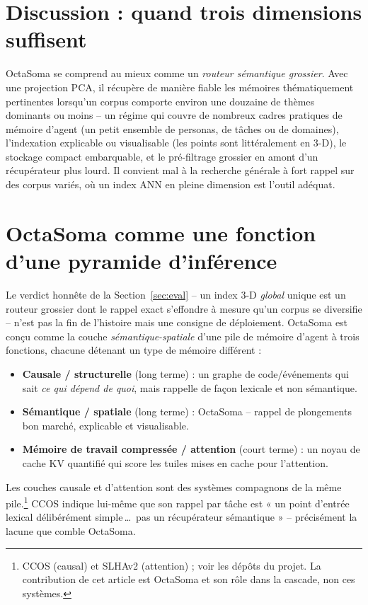 \documentclass[11pt]{article}
\begin{document}
\section{Discussion : quand trois dimensions suffisent}
OctaSoma se comprend au mieux comme un \emph{routeur sémantique grossier}. Avec une
projection PCA, il récupère de manière fiable les mémoires thématiquement pertinentes
lorsqu'un corpus comporte environ une douzaine de thèmes dominants ou moins -- un
régime qui couvre de nombreux cadres pratiques de mémoire d'agent (un petit ensemble
de personas, de tâches ou de domaines), l'indexation explicable ou visualisable (les
points sont littéralement en 3-D), le stockage compact embarquable, et le
pré-filtrage grossier en amont d'un récupérateur plus lourd. Il convient mal à la
recherche générale à fort rappel sur des corpus variés, où un index ANN en pleine
dimension est l'outil adéquat.

\section{OctaSoma comme une fonction d'une pyramide d'inférence}
\label{sec:pyramid}
Le verdict honnête de la Section~\ref{sec:eval} -- un index 3-D \emph{global} unique
est un routeur grossier dont le rappel exact s'effondre à mesure qu'un corpus se
diversifie -- n'est pas la fin de l'histoire mais une consigne de déploiement.
OctaSoma est conçu comme la couche \emph{sémantique-spatiale} d'une pile de mémoire
d'agent à trois fonctions, chacune détenant un type de mémoire différent :
\begin{itemize}
  \item \textbf{Causale / structurelle} (long terme) : un graphe de code/événements
  qui sait \emph{ce qui dépend de quoi}, mais rappelle de façon lexicale et non
  sémantique.
  \item \textbf{Sémantique / spatiale} (long terme) : OctaSoma -- rappel de
  plongements bon marché, explicable et visualisable.
  \item \textbf{Mémoire de travail compressée / attention} (court terme) : un noyau
  de cache KV quantifié qui score les tuiles mises en cache pour l'attention.
\end{itemize}
Les couches causale et d'attention sont des systèmes compagnons de la même
pile.\footnote{CCOS (causal) et SLHAv2 (attention) ; voir les dépôts du projet. La
contribution de cet article est OctaSoma et son rôle dans la cascade, non ces
systèmes.} CCOS indique lui-même que son rappel par tâche est « un point d'entrée
lexical délibérément simple\,\dots\ pas un récupérateur sémantique » -- précisément
la lacune que comble OctaSoma.
\end{document}
